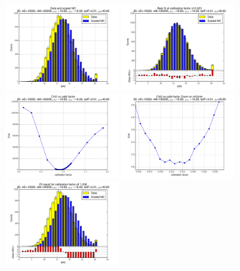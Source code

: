 
 \begin{figure}[htbp] \begin{center} 
\includegraphics[width=0.45\textwidth]{../FIGURES/25/FIG_Data_and_scaled_MC.pdf} 
\includegraphics[width=0.45\textwidth]{../FIGURES/25/FIG_Best_fit_at_calibration_factor_of_0_923.pdf} 
\includegraphics[width=0.45\textwidth]{../FIGURES/25/FIG_Chi2_vs_calib_factor.pdf} 
\includegraphics[width=0.45\textwidth]{../FIGURES/25/FIG_Chi2_vs_calib_factor_Zoom_on_chi2min.pdf} 
\includegraphics[width=0.45\textwidth]{../FIGURES/25/FIG_Fit_result_for_calibration_factor_of_1_036.pdf} 

\end{center}
\end{figure}
